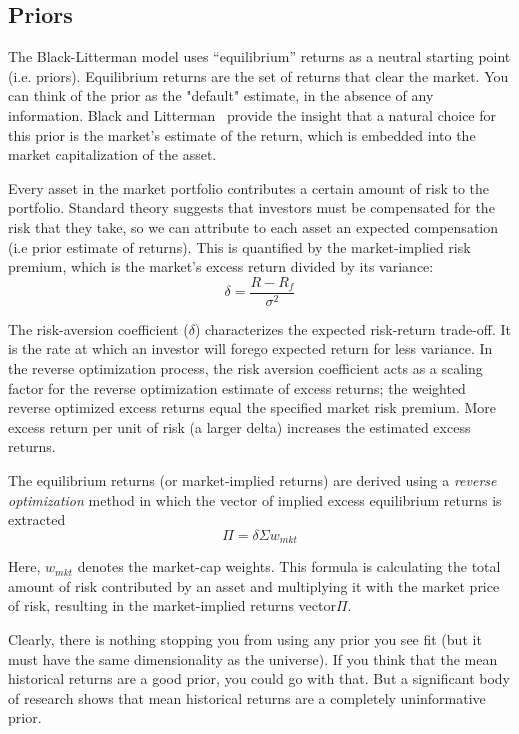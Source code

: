 \subsection{Priors}
The Black-Litterman model uses “equilibrium” returns as a neutral starting point (i.e. priors). Equilibrium returns are the set of returns that clear the market.
You can think of the prior as the "default" estimate, in the absence of any information. Black and Litterman~\cite{bib:bl_prior} provide the insight that a natural choice for this prior is the market’s estimate of the return, which is embedded into the market capitalization of the asset.

Every asset in the market portfolio contributes a certain amount of risk to the portfolio. Standard theory suggests that investors must be compensated for the risk that they take, so we can attribute to each asset an expected compensation (i.e prior estimate of returns). This is quantified by the market-implied risk premium, which is the market’s excess return divided by its variance:
\begin{equation}
\delta = \frac{R-R_f}{\sigma^2}
\end{equation}

The risk-aversion coefficient ($\delta$) characterizes the expected risk-return trade-off. It is the rate at which an investor will forego expected return for less variance. In the reverse optimization process, the risk aversion coefficient acts as a scaling factor for the reverse optimization estimate of excess returns; the weighted reverse optimized excess returns equal the specified market risk premium. More excess return per unit of risk (a larger delta) increases the estimated excess returns.

The equilibrium returns (or market-implied returns) are derived using a \emph{reverse optimization} method in which the vector of implied excess equilibrium returns is extracted
\begin{equation}
\Pi=\delta \Sigma w_{mkt}
\end{equation}

Here, $w_{mkt}$ denotes the market-cap weights. This formula is calculating the total amount of risk contributed by an asset and multiplying it with the market price of risk, resulting in the market-implied returns vector$\Pi$.

Clearly, there is nothing stopping you from using any prior you see fit (but it must have the same dimensionality as the universe). If you think that the mean historical returns are a good prior, you could go with that. But a significant body of research shows that mean historical returns are a completely uninformative prior.

